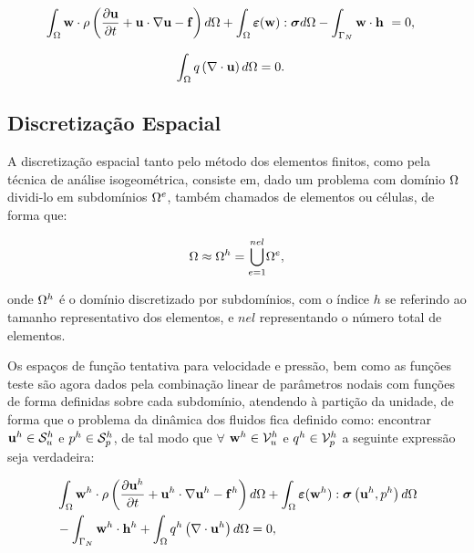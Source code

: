 \documentclass[tese_patricia]{subfiles}%
\begin{document}
\begin{align}
\int_{\Omega} \mathbf{w} \cdot \rho  \left(\frac{\partial\mathbf{u}}{\partial t}  + \mathbf{u}\cdot\nabla\mathbf{u} - \mathbf{f} \right) d\Omega + \int_{\Omega} \bm{\varepsilon}(\mathbf{w}) : \boldsymbol{\sigma}  d\Omega - \int_{\Gamma_N} \mathbf{w} \cdot \mathbf{h} \  &= 0,  \label{eq:NSWeakForm1} 
\end{align}

\begin{align}
\int_{\Omega} q \left(\nabla \cdot \mathbf{u}\right) d \Omega &= 0. \label{eq:CWeakForm1} 
\end{align}

\subsection{Discretização Espacial} \label{capitulo:Cap2:DiscEspacial}

A discretização espacial tanto pelo método dos elementos finitos, como pela técnica de análise isogeométrica, consiste em, dado um problema com domínio $\Omega$ dividi-lo em subdomínios $\Omega^{e}$, também chamados de elementos ou células, de forma que:

\begin{align}
\Omega \approx \Omega^{h} = {\bigcup_{e = 1}^{nel}} \Omega^{e},
\end{align}

\noindent onde $\Omega^{h}$ é o domínio discretizado por subdomínios, com o índice $h$ se referindo ao tamanho representativo dos elementos, e $nel$ representando o número total de elementos.

Os espaços de função tentativa para velocidade e pressão, bem como as funções teste são agora dados pela combinação linear de parâmetros nodais com funções de forma definidas sobre cada subdomínio, atendendo à partição da unidade, de forma que o problema da dinâmica dos fluidos fica definido como: encontrar $\mathbf{u}^h \in \mathcal{S}_u^h$ e $p^h \in \mathcal{S}_p^h$, de tal modo que $\forall$ $\mathbf{w}^h \in \mathcal{V}_u^h$ e $q^h \in \mathcal{V}_p^h$ a seguinte expressão seja verdadeira:

\begin{align}
	\begin{split}
		&\int_{\Omega} \mathbf{w}^h \cdot \rho \left(\frac{\partial\mathbf{u}^h}{\partial t} + \mathbf{u}^h\cdot\nabla\mathbf{u}^h - \mathbf{f}^{h}\right) d\Omega + \int_{\Omega} \bm{\varepsilon}(\mathbf{w}^h) : \boldsymbol{\sigma}\left(\mathbf{u}^h,p^h \right)  d\Omega\\ & - \int_{\Gamma_N} \mathbf{w}^h \cdot \mathbf{h}^{h} + \int_{\Omega} q^h \left(\nabla \cdot \mathbf{u}^h\right) d \Omega = 0,  \label{eq:NSWeakForm2} 
	\end{split}
\end{align}
\end{document}
